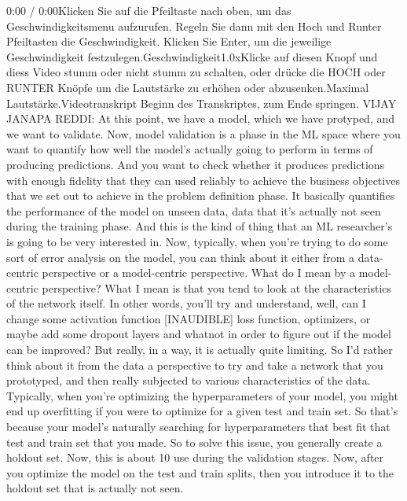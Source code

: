 {{    0:00 / 0:00Klicken Sie auf die Pfeiltaste nach oben, um das Geschwindigkeitsmenu aufzurufen. Regeln Sie dann mit den Hoch und Runter Pfeiltasten die Geschwindigkeit. Klicken Sie Enter, um die jeweilige Geschwindigkeit festzulegen.Geschwindigkeit1.0xKlicke auf diesen Knopf und diess Video stumm oder nicht stumm zu schalten, oder drücke die HOCH oder RUNTER Knöpfe um die Lautstärke zu erhöhen oder abzusenken.Maximal Lautstärke.Videotranskript
    Beginn des Transkriptes, zum Ende springen.
    VIJAY JANAPA REDDI: At this point, we have a model, which we have protyped,
    and we want to validate.
    Now, model validation is a phase in the ML space
    where you want to quantify how well the model's actually going to perform
    in terms of producing predictions.
    And you want to check whether it produces predictions
    with enough fidelity that they can used reliably
    to achieve the business objectives that we set out to achieve in the problem
    definition phase.
    It basically quantifies the performance of the model
    on unseen data, data that it's actually not seen during the training phase.
    And this is the kind of thing that an ML researcher's
    is going to be very interested in.
    Now, typically, when you're trying to do some sort of error analysis
    on the model, you can think about it either from a data-centric perspective
    or a model-centric perspective.
    What do I mean by a model-centric perspective?
    What I mean is that you tend to look at the characteristics
    of the network itself.
    In other words, you'll try and understand, well,
    can I change some activation function [INAUDIBLE] loss function, optimizers,
    or maybe add some dropout layers and whatnot in order to figure out
    if the model can be improved?
    But really, in a way, it is actually quite limiting.
    So I'd rather think about it from the data
    a perspective to try and take a network that you prototyped, and then
    really subjected to various characteristics of the data.
    Typically, when you're optimizing the hyperparameters of your model,
    you might end up overfitting if you were to optimize for a given test and train
    set.
    So that's because your model's naturally searching for hyperparameters
    that best fit that test and train set that you made.
    So to solve this issue, you generally create a holdout set.
    Now, this is about 10%
    use during the validation stages.
    Now, after you optimize the model on the test and train
    splits, then you introduce it to the holdout set that is actually not seen.
}}

